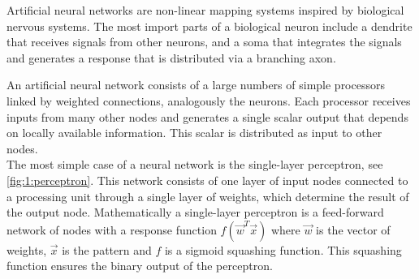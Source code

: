 Artificial neural networks are non-linear mapping systems inspired by biological nervous systems. The most import parts of a biological neuron include a dendrite that receives signals from other neurons, and a soma that integrates the signals and generates a response that is distributed via a branching axon. 

An artificial neural network consists of a large numbers of simple processors linked by weighted connections, analogously the neurons. Each processor receives inputs from many other nodes and generates a single scalar output that depends on locally available information. This scalar is distributed as input to other nodes. \\

The most simple case of a neural network is the single-layer perceptron, see \autoref{fig:1:perceptron}. This network consists of one layer of input nodes connected to a processing unit through a single layer of weights, which determine the result of the output node. Mathematically a single-layer perceptron is a feed-forward network of nodes with a response function $f(\vec{w}^T\vec{x})$ where $\vec{w}$ is the vector of weights, $\vec{x}$ is the pattern and $f$ is a sigmoid squashing function\cite{reed1998neural}. This squashing function ensures the binary output of the perceptron. \\

